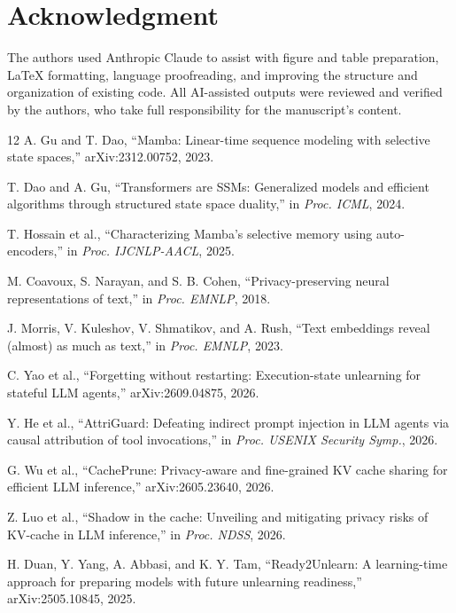 \documentclass[conference]{IEEEtran}
\begin{document}
\section*{Acknowledgment}
The authors used Anthropic Claude to assist with figure and table preparation, \LaTeX{} formatting, language proofreading, and improving the structure and organization of existing code. All AI-assisted outputs were reviewed and verified by the authors, who take full responsibility for the manuscript's content.

\begin{thebibliography}{12}
\scriptsize
\setlength{\itemsep}{0pt}
\setlength{\parskip}{0pt}
\setlength{\parsep}{0pt}
A. Gu and T. Dao, ``Mamba: Linear-time sequence modeling with selective state spaces,'' arXiv:2312.00752, 2023.

T. Dao and A. Gu, ``Transformers are SSMs: Generalized models and efficient algorithms through structured state space duality,'' in \emph{Proc. ICML}, 2024.

T. Hossain et al., ``Characterizing Mamba's selective memory using auto-encoders,'' in \emph{Proc. IJCNLP-AACL}, 2025.

M. Coavoux, S. Narayan, and S. B. Cohen, ``Privacy-preserving neural representations of text,'' in \emph{Proc. EMNLP}, 2018.

J. Morris, V. Kuleshov, V. Shmatikov, and A. Rush, ``Text embeddings reveal (almost) as much as text,'' in \emph{Proc. EMNLP}, 2023.

C. Yao et al., ``Forgetting without restarting: Execution-state unlearning for stateful LLM agents,'' arXiv:2609.04875, 2026.

Y. He et al., ``AttriGuard: Defeating indirect prompt injection in LLM agents via causal attribution of tool invocations,'' in \emph{Proc. USENIX Security Symp.}, 2026.

G. Wu et al., ``CachePrune: Privacy-aware and fine-grained KV cache sharing for efficient LLM inference,'' arXiv:2605.23640, 2026.

Z. Luo et al., ``Shadow in the cache: Unveiling and mitigating privacy risks of KV-cache in LLM inference,'' in \emph{Proc. NDSS}, 2026.

H. Duan, Y. Yang, A. Abbasi, and K. Y. Tam, ``Ready2Unlearn: A learning-time approach for preparing models with future unlearning readiness,'' arXiv:2505.10845, 2025.


\end{thebibliography}
\end{document}
